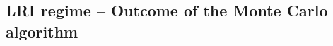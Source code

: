 \documentclass[12pt, titlepage]{report}
\begin{document}
%

\subsection{LRI regime -- Outcome of the Monte Carlo algorithm}
\end{document}

